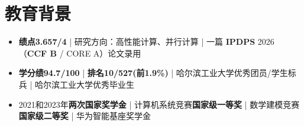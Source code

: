 \section{教育背景}
\begin{itemize}
  \item \textbf{绩点3.657/4} | 研究方向：高性能计算、并行计算 | 一篇 \textbf{IPDPS} 2026 （\textbf{CCF B} / CORE A）论文录用
\end{itemize}
\begin{itemize}
  \item \textbf{学分绩94.7/100} | \textbf{排名10/527(前1.9\%)} | 哈尔滨工业大学优秀团员/学生标兵 | 哈尔滨工业大学优秀毕业生
  \item 2021和2023年\textbf{两次国家奖学金} | 计算机系统竞赛\textbf{国家级一等奖} | 数学建模竞赛\textbf{国家级二等奖} | 华为智能基座奖学金
\end{itemize}
